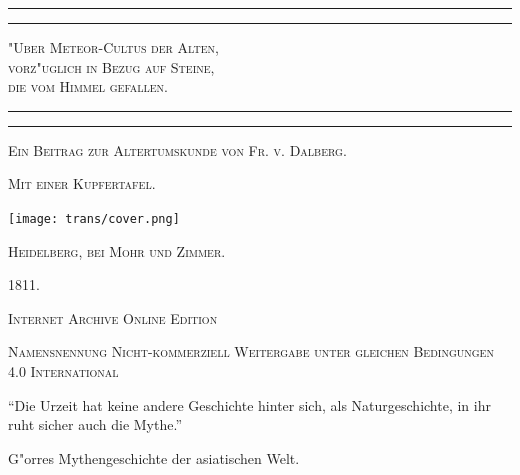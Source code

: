 \documentclass[a4paper, 11pt, oneside, polutonikogreek, german]{article}
\begin{document}
\begin{titlepage} %
	\centering %

	
	\rule{\textwidth}{1.6pt}\vspace*{-\baselineskip}\vspace*{2pt} %
	\rule{\textwidth}{0.4pt} %
	
	{\scshape\LARGE "Uber Meteor-Cultus der Alten,\\[1.25pt] vorz"uglich in Bezug auf Steine,\\[1.25pt] die vom Himmel gefallen.\\[1.25pt]}
	
	\rule{\textwidth}{0.4pt}\vspace*{-\baselineskip}\vspace{3.2pt} %
	\rule{\textwidth}{1.6pt} %

	
	{\scshape Ein Beitrag zur Altertumskunde von Fr. v. Dalberg.} %
	
    {\scshape\scriptsize Mit einer Kupfertafel.} %
    
	
	\texttt{[image: trans/cover.png]}
	
    \vspace*{\fill}

	\vspace{1\baselineskip}

	{\small\scshape Heidelberg, bei Mohr und Zimmer.}
	
	{\small\scshape{1811.}}
	
	\vspace{0.5\baselineskip} %

    \scshape Internet Archive Online Edition  %
	
	{\scshape\small Namensnennung Nicht-kommerziell Weitergabe unter gleichen Bedingungen 4.0 International} %
\end{titlepage}
\setlength{\parskip}{1mm plus1mm minus1mm}
\clearpage
\vspace*{\fill}
\begin{center}
"`Die Urzeit hat keine andere Geschichte hinter sich, als Naturgeschichte, in ihr ruht sicher auch die Mythe."'
\end{center}
\begin{center}
G"orres Mythengeschichte der asiatischen Welt.
\end{center}
\vspace*{\fill}
\clearpage
\end{document}
